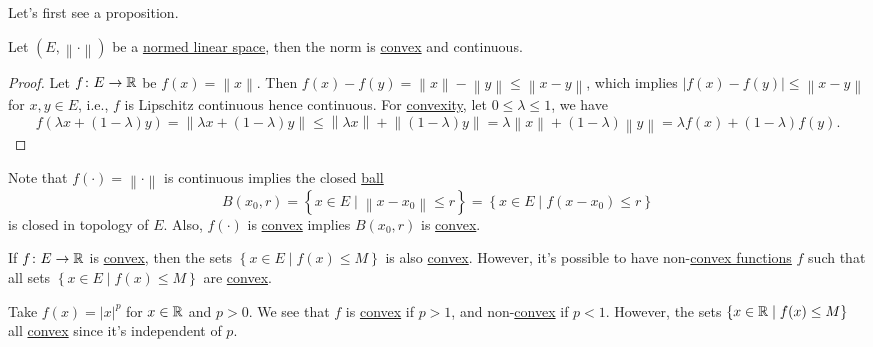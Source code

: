 Let's first see a proposition.

\begin{proposition}
	Let \((E, \left\lVert \cdot\right\rVert)\) be a \hyperref[def:normed-vector-space]{normed linear space}, then the norm is \hyperref[def:convex-function]{convex} and continuous.
\end{proposition}
\begin{proof}
	Let \(f\colon E\to \mathbb{\MakeUppercase{r}} \) be \(f(x) = \left\lVert x\right\rVert \). Then \(f(x) - f(y) = \left\lVert x\right\rVert - \left\lVert y\right\rVert  \leq \left\lVert x-y\right\rVert\), which implies \(\left\vert f(x) - f(y) \right\vert \leq \left\lVert x-y\right\rVert \) for \(x, y\in E\), i.e., \(f\) is Lipschitz continuous hence continuous. For \hyperref[def:convex-function]{convexity}, let \(0 \leq \lambda \leq 1\), we have
	\[
		f(\lambda x+(1-\lambda )y) = \left\lVert \lambda x + (1-\lambda )y\right\rVert \leq \left\lVert \lambda x\right\rVert + \left\lVert (1-\lambda )y\right\rVert = \lambda \left\lVert x\right\rVert + (1-\lambda )\left\lVert y\right\rVert  = \lambda f(x) + (1-\lambda )f(y).
	\]
\end{proof}

\begin{note}
	Note that \(f(\cdot) = \left\lVert \cdot\right\rVert \) is continuous implies the closed \hyperref[def:ball]{ball}
	\[
		B(x_0, r) = \left\{ x\in E\mid \left\lVert x-x_0\right\rVert\leq r\right\} = \left\{ x\in E\mid f(x-x_0)\leq r \right\}
	\]
	is closed in topology of \(E\). Also, \(f(\cdot)\) is \hyperref[def:convex-function]{convex} implies \(B(x_0, r)\) is \hyperref[def:convex-set]{convex}.
\end{note}

\begin{remark}
	If \(f\colon E\to \mathbb{\MakeUppercase{r}} \) is \hyperref[def:convex-function]{convex}, then the sets \(\left\{ x\in E\mid f(x) \leq M \right\}\) is also \hyperref[def:convex-set]{convex}. However, it's possible to have non-\hyperref[def:convex-function]{convex functions} \(f\) such that all sets \(\left\{ x\in E \mid f(x) \leq M \right\} \) are \hyperref[def:convex-set]{convex}.
\end{remark}
\begin{explanation}
	Take \(f(x) = \left\vert x \right\vert ^p\) for \(x\in \mathbb{\MakeUppercase{r}} \) and \(p > 0\). We see that \(f\) is \hyperref[def:convex-function]{convex} if \(p>1\), and non-\hyperref[def:convex-function]{convex} if \(p<1\). However, the sets \(\left\{ x\in \mathbb{\MakeUppercase{R}} \mid f(x) \leq M \right\} \) all \hyperref[def:convex-set]{convex} since it's independent of \(p\).
\end{explanation}

